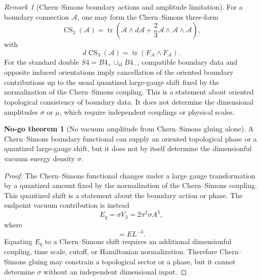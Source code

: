 \documentclass[11pt,a4paper]{article}
\def\Bfour{B4}%
\def\Sfour{S4}%
\def\dd{d}%
\numberwithin{equation}{section}
\theoremstyle{definition}
\newtheorem{nogotheorem}[criterion]{No-go theorem}
\theoremstyle{plain}
\theoremstyle{remark}
\newtheorem{remark}[criterion]{Remark}
\newcommand{\Sfour}{S^4}
\newcommand{\Bfour}{B^4}
\newcommand{\dd}{\mathrm{d}}
\begin{document}
\begin{remark}[Chern--Simons boundary actions and amplitude limitation]
For a boundary connection \(\mathcal{A}\), one may form the Chern--Simons three-form \cite{ChernSimons1974}
\begin{equation}
\operatorname{CS}_3(\mathcal{A})=
\operatorname{tr}\left(\mathcal{A}\wedge\dd\mathcal{A}
+\frac{2}{3}\mathcal{A}\wedge\mathcal{A}\wedge\mathcal{A}\right),
\end{equation}
with
\begin{equation}
\dd\operatorname{CS}_3(\mathcal{A})=\operatorname{tr}(F_{\mathcal{A}}\wedge F_{\mathcal{A}}).
\end{equation}
For the standard double \(\Sfour=\Bfour_+\cup_{\mathrm{id}}\Bfour_-\), compatible boundary data and opposite induced orientations imply cancellation of the oriented boundary contributions up to the usual quantized large-gauge shift fixed by the normalization of the Chern--Simons coupling. This is a statement about oriented topological consistency of boundary data. It does not determine the dimensional amplitudes \(\sigma\) or \(\mu\), which require independent couplings or physical scales.
\end{remark}


\begin{nogotheorem}[No vacuum amplitude from Chern--Simons gluing alone]
A Chern--Simons boundary functional can supply an oriented topological phase or a quantized large-gauge shift, but it does not by itself determine the dimensionful vacuum energy density \(\sigma\).
\end{nogotheorem}
\begin{proof}
The Chern--Simons functional changes under a large gauge transformation by a quantized amount fixed by the normalization of the Chern--Simons coupling. This quantized shift is a statement about the boundary action or phase. The endpoint vacuum contribution is instead
\begin{equation}
E_q=\sigma V_3=2\pi^2\sigma A^3,
\end{equation}
where
\begin{equation}
[\sigma]=EL^{-3}.
\end{equation}
Equating \(E_q\) to a Chern--Simons shift requires an additional dimensionful coupling, time scale, cutoff, or Hamiltonian normalization. Therefore Chern--Simons gluing may constrain a topological sector or a phase, but it cannot determine \(\sigma\) without an independent dimensional input.
\end{proof}
\end{document}
